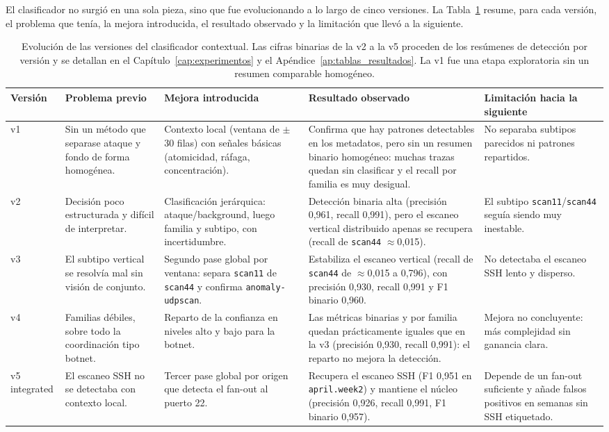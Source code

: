 El clasificador no surgió en una sola pieza, sino que fue evolucionando a lo largo de cinco versiones. La Tabla~\ref{tab:versiones} resume, para cada versión, el problema que tenía, la mejora introducida, el resultado observado y la limitación que llevó a la siguiente.

\begin{table}[!htbp]
\centering
\scriptsize
\setlength{\tabcolsep}{4pt}
\begin{tabular}{|l|p{2.6cm}|p{3.0cm}|p{3.3cm}|p{2.6cm}|}
\hline
\textbf{Versión} & \textbf{Problema previo} & \textbf{Mejora introducida} & \textbf{Resultado observado} & \textbf{Limitación hacia la siguiente} \\
\hline
v1 & Sin un método que separase ataque y fondo de forma homogénea. & Contexto local (ventana de $\pm$30 filas) con señales básicas (atomicidad, ráfaga, concentración). & Confirma que hay patrones detectables en los metadatos, pero sin un resumen binario homogéneo: muchas trazas quedan sin clasificar y el recall por familia es muy desigual. & No separaba subtipos parecidos ni patrones repartidos. \\
\hline
v2 & Decisión poco estructurada y difícil de interpretar. & Clasificación jerárquica: ataque/background, luego familia y subtipo, con incertidumbre. & Detección binaria alta (precisión 0,961, recall 0,991), pero el escaneo vertical distribuido apenas se recupera (recall de \texttt{scan44} $\approx$0,015). & El subtipo \texttt{scan11}/\texttt{scan44} seguía siendo muy inestable. \\
\hline
v3 & El subtipo vertical se resolvía mal sin visión de conjunto. & Segundo pase global por ventana: separa \texttt{scan11} de \texttt{scan44} y confirma \texttt{anomaly-udpscan}. & Estabiliza el escaneo vertical (recall de \texttt{scan44} de $\approx$0,015 a 0,796), con precisión 0,930, recall 0,991 y F1 binario 0,960. & No detectaba el escaneo SSH lento y disperso. \\
\hline
v4 & Familias débiles, sobre todo la coordinación tipo botnet. & Reparto de la confianza en niveles alto y bajo para la botnet. & Las métricas binarias y por familia quedan prácticamente iguales que en la v3 (precisión 0,930, recall 0,991): el reparto no mejora la detección. & Mejora no concluyente: más complejidad sin ganancia clara. \\
\hline
v5 integrated & El escaneo SSH no se detectaba con contexto local. & Tercer pase global por origen que detecta el fan-out al puerto 22. & Recupera el escaneo SSH (F1 0,951 en \texttt{april.week2}) y mantiene el núcleo (precisión 0,926, recall 0,991, F1 binario 0,957). & Depende de un fan-out suficiente y añade falsos positivos en semanas sin SSH etiquetado. \\
\hline
\end{tabular}
\caption{Evolución de las versiones del clasificador contextual. Las cifras binarias de la v2 a la v5 proceden de los resúmenes de detección por versión y se detallan en el Capítulo~\ref{cap:experimentos} y el Apéndice~\ref{ap:tablas_resultados}. La v1 fue una etapa exploratoria sin un resumen comparable homogéneo.}
\label{tab:versiones}
\end{table}

